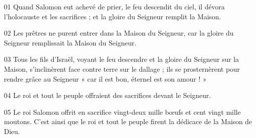 01 Quand Salomon eut achevé de prier, le feu descendit du ciel, il dévora l’holocauste et les sacrifices ; et la gloire du Seigneur remplit la Maison.

02 Les prêtres ne purent entrer dans la Maison du Seigneur, car la gloire du Seigneur remplissait la Maison du Seigneur.

03 Tous les fils d’Israël, voyant le feu descendre et la gloire du Seigneur sur la Maison, s’inclinèrent face contre terre sur le dallage ; ils se prosternèrent pour rendre grâce au Seigneur « car il est bon, éternel est son amour ! »

04 Le roi et tout le peuple offraient des sacrifices devant le Seigneur.

05 Le roi Salomon offrit en sacrifice vingt-deux mille bœufs et cent vingt mille moutons. C’est ainsi que le roi et tout le peuple firent la dédicace de la Maison de Dieu.
